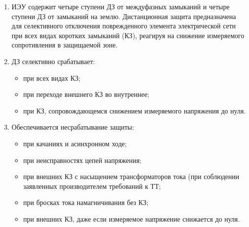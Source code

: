 \color{black}

\begin{enumerate}[label=\arabic{section}.\arabic{subsection}.\arabic*,  align=left, labelsep=4pt, leftmargin=0pt, itemindent=57pt]

\item
ИЭУ содержит четыре ступени ДЗ от междуфазных замыканий и четыре ступени ДЗ от замыканий
на землю. Дистанционная  защита  предназначена  для  селективного  отключения  поврежденного  элемента
электрической  сети  при  всех видах  коротких  замыканий (КЗ),  реагируя  на снижение измеряемого
сопротивления в защищаемой зоне.

\item 
ДЗ селективно срабатывает:
\begin{itemize}
    \item при всех видах КЗ; 
    \item при переходе внешнего КЗ во внутреннее; 
    \item при КЗ, сопровождающемся снижением измеряемого напряжения до нуля.
\end{itemize}

\item 
Обеспечивается несрабатывание защиты:
\begin{itemize} 
\item при качаниях и асинхронном ходе; 
\item при неисправностях цепей напряжения;
\item при внешних КЗ с насыщением трансформаторов тока (при соблюдении заявленных производителем требований к ТТ; 
\item при бросках тока намагничивания без КЗ;
\item при внешних КЗ, даже если измеряемое напряжение снижается до нуля.
\end{itemize}


\end{enumerate}
